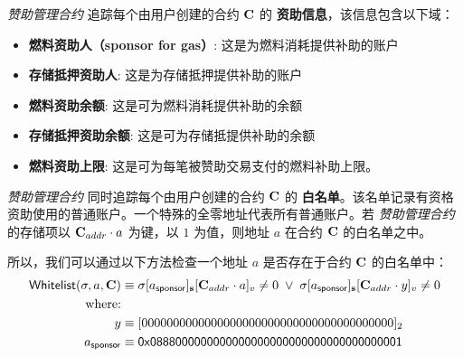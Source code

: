 \emph{赞助管理合约} 追踪每个由用户创建的合约 $\mathbf{C}$ 的 {\bf 资助信息}，该信息包含以下域：
\begin{itemize}[nosep]
	\item {\bf 燃料资助人（sponsor for gas）}: 这是为燃料消耗提供补助的账户

	\item {\bf 存储抵押资助人}: 这是为存储抵押提供补助的账户

	\item {\bf 燃料资助余额}: 这是可为燃料消耗提供补助的余额

	\item {\bf 存储抵押资助余额}: 这是可为存储抵提供补助的余额

	\item {\bf 燃料资助上限}:	这是可为每笔被赞助交易支付的燃料补助上限。
\end{itemize}

\emph{赞助管理合约} 同时追踪每个由用户创建的合约 $\mathbf{C}$ 的 {\bf 白名单}。该名单记录有资格资助使用的普通账户。一个特殊的全零地址代表所有普通账户。若 \emph{赞助管理合约} 的存储项以 $\mathbf{C}_{addr}\cdot a$ 为键，以 $1$ 为值，则地址 $a$ 在合约 $\mathbf{C}$ 的白名单之中。

所以，我们可以通过以下方法检查一个地址 $a$ 是否存在于合约 $\mathbf{C}$ 的白名单中：
\begin{align}
	\mathsf{Whitelist}(\mathbf{\sigma},a,\mathbf{C}) &\equiv \mathbf{\sigma}[a_{\sf sponsor}]_{\bf s}[\mathbf{C}_{addr}\cdot a]_v \neq 0 \;\vee\; \mathbf{\sigma}[a_{\sf sponsor}]_{\bf s}[\mathbf{C}_{addr}\cdot y]_v \neq 0 \notag \\
	\mbox{where:}&\notag \\
	y&\equiv [0000000000000000000000000000000000000000]_2 \notag \\ 
	a_{\sf sponsor} & \equiv {\sf 0x0888000000000000000000000000000000000001} \label{eq:whitelist}
\end{align}



